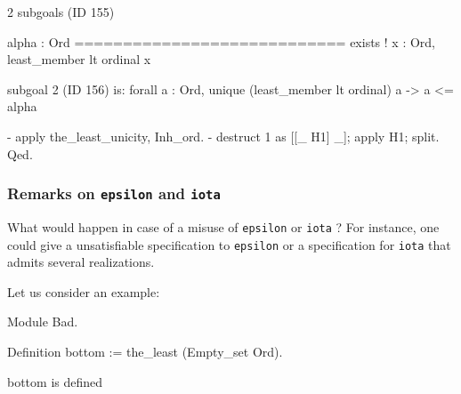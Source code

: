 \begin{Coqanswer}
2 subgoals (ID 155)
  
  alpha : Ord
  ============================
  exists ! x : Ord, least_member lt ordinal x

subgoal 2 (ID 156) is:
 forall a : Ord, unique (least_member lt ordinal) a -> 
                a <= alpha
\end{Coqanswer}

\begin{Coqsrc}
  -  apply the_least_unicity, Inh_ord.
  -  destruct 1 as [[_ H1] _]; apply H1; split. 
Qed.
\end{Coqsrc}

\subsubsection{Remarks on \texttt{epsilon} and \texttt{iota}}

 What would happen in case of a misuse of \texttt{epsilon} or \texttt{iota} ?
For instance, one could give a unsatisfiable specification to \texttt{epsilon} or 
a specification for \texttt{iota} that admits several realizations.

Let us consider an example:

\begin{Coqbad}
Module Bad.

 Definition bottom := the_least (Empty_set Ord).
\end{Coqbad}

\begin{Coqanswer}
 bottom is defined
\end{Coqanswer}

